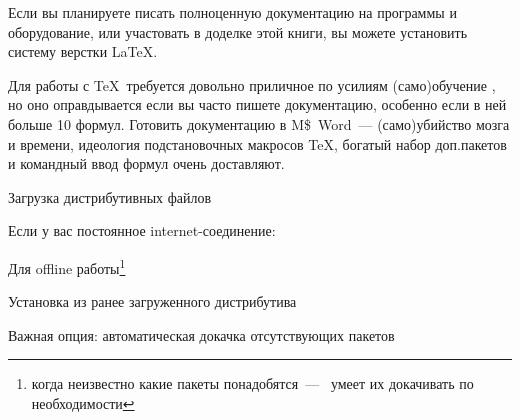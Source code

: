 \label{texinstall}

Если вы планируете писать полноценную документацию на программы
и оборудование, или участовать в доделке этой книги, вы можете установить
систему верстки \LaTeX.

Для работы с \TeX\ требуется довольно приличное по усилиям
(само)обучение \cite{lvovsky}, но оно оправдывается если вы часто 
пишете документацию, особенно если в ней больше 10 формул.
Готовить документацию в M\$\ Word\ --- (само)убийство мозга и времени,
идеология подстановочных макросов \TeX, богатый набор доп.пакетов
и командный ввод формул очень доставляют.


\bigskip{}


\bigskip Загрузка дистрибутивных файлов



Если у вас постоянное internet-соединение: 

Для offline работы\footnote{когда неизвестно какие пакеты понадобятся\ ---
\miktex\ умеет их докачивать по необходимости} 



\bigskip Установка из ранее загруженного дистрибутива








Важная опция: автоматическая докачка отсутствующих пакетов

